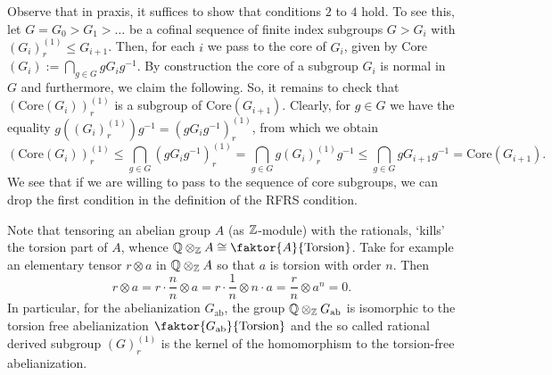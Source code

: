 Observe that in praxis, it suffices to show that conditions \(2\) to \(4\) hold. %
To see this, let \(G = G_0 > G_1 > \ldots\) be a cofinal sequence of finite index subgroups \(G > G_i\) with \((G_i)_r^{(1)} \leq G_{i+1}\).
Then, for each \(i\) we pass to the core of \(G_i\), given by Core\((G_i) := \bigcap_{g \in G} g G_i g^{-1}\).
By construction the core of a subgroup \(G_i\) is normal in \(G\) and furthermore, we claim the following.
So, it remains to check that \((\text{Core}(G_i))_r^{(1)}\) is a subgroup of Core\((G_{i+1})\).
Clearly,  for \(g \in G\) we have the equality \(g((G_i)_r^{(1)})g^{-1} = (gG_ig^{-1})_r^{(1)}\), from which we obtain
\[(\text{Core}(G_i))_r^{(1)} \leq \bigcap_{g \in G} (gG_ig^{-1})_r^{(1)} = \bigcap_{g \in G} g(G_i)_r^{(1)}g^{-1} \leq \bigcap_{g \in G} gG_{i+1}g^{-1} = \text{Core}(G_{i+1}).\]
We see that if we are willing to pass to the sequence of core subgroups, we can drop the first condition in the definition of the RFRS condition.

\begin{remark}\label{rmk:tensoring}
    Note that tensoring an abelian group \(A\) (as \(\mathbb{Z}\)-module) with the rationals, `kills' the torsion part of \(A\), whence \(\Q \otimes_\Z A \cong \faktor{A}{\text{Torsion}}\).
    Take for example an elementary tensor \(r \otimes a\) in \(\mathbb{Q} \otimes_{\mathbb{Z}} A\) so that \(a\) is torsion with order \(n\).
    Then
    \[r \otimes a  = r \cdot \frac{n}{n} \otimes a = r \cdot \frac{1}{n} \otimes n\cdot a = \frac{r}{n} \otimes a^n = 0.\]
    In particular, for the abelianization \(G_{\text{ab}}\), the group \(\mathbb{Q} \otimes_{\mathbb{Z}} G_{\text{ab}}\) is isomorphic to the torsion free abelianization \(\faktor{G_{\text{ab}}}{\text{Torsion}}\) and the so called rational derived subgroup \((G)_r^{(1)}\) is the kernel of the homomorphism to the torsion-free abelianization.
\end{remark}


